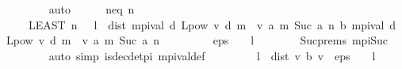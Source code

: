 \begin{isabellebody}
\ \ \ \ \ \ \isamarkupfalse%
\ auto\isanewline
\ \ \ \ \isamarkupfalse%
\ n{\isacharunderscore}{\kern0pt}eq{\isacharcolon}{\kern0pt}\ {\isachardoublequoteopen}n\ {\isacharequal}{\kern0pt}\isanewline
\ \ \ \ {\isacharparenleft}{\kern0pt}LEAST\ n{\isachardot}{\kern0pt}\ {}\ {\isacharasterisk}{\kern0pt}\ l\ {\isacharasterisk}{\kern0pt}\ dist\ {\isacharparenleft}{\kern0pt}mpi{\isacharunderscore}{\kern0pt}val\ {\isacharquery}{\kern0pt}d\ {\isacharparenleft}{\kern0pt}L{\isacharunderscore}{\kern0pt}pow\ v\ {\isacharquery}{\kern0pt}d\ {\isacharparenleft}{\kern0pt}m\ {}\ v{\isacharparenright}{\kern0pt}{\isacharparenright}{\kern0pt}\ {\isacharparenleft}{\kern0pt}{\isasymlambda}a{\isachardot}{\kern0pt}\ m\ {\isacharparenleft}{\kern0pt}Suc\ a{\isacharparenright}{\kern0pt}{\isacharparenright}{\kern0pt}\ n{\isacharparenright}{\kern0pt}\ {\isacharparenleft}{\kern0pt}{\isasymL}\isactrlsub b\ {\isacharparenleft}{\kern0pt}mpi{\isacharunderscore}{\kern0pt}val\ {\isacharquery}{\kern0pt}d\ {\isacharparenleft}{\kern0pt}L{\isacharunderscore}{\kern0pt}pow\ v\ {\isacharquery}{\kern0pt}d\ {\isacharparenleft}{\kern0pt}m\ {}\ v{\isacharparenright}{\kern0pt}{\isacharparenright}{\kern0pt}\ {\isacharparenleft}{\kern0pt}{\isasymlambda}a{\isachardot}{\kern0pt}\ m\ {\isacharparenleft}{\kern0pt}Suc\ a{\isacharparenright}{\kern0pt}{\isacharparenright}{\kern0pt}\ n{\isacharparenright}{\kern0pt}{\isacharparenright}{\kern0pt}\isanewline
\ \ \ \ \ \ \ \ {\isacharless}{\kern0pt}\ eps\ {\isacharasterisk}{\kern0pt}\ {\isacharparenleft}{\kern0pt}{}\ {\isacharminus}{\kern0pt}\ l{\isacharparenright}{\kern0pt}{\isacharparenright}{\kern0pt}{\isachardoublequoteclose}\isanewline
\ \ \ \ \ \ \isamarkupfalse%
\ Suc{\isachardot}{\kern0pt}prems\ mpi{\isacharunderscore}{\kern0pt}Suc{\isacharprime}{\kern0pt}\isanewline
\ \ \ \ \ \ \isamarkupfalse%
\ {\isacharparenleft}{\kern0pt}auto\ simp{\isacharcolon}{\kern0pt}\ is{\isacharunderscore}{\kern0pt}dec{\isacharunderscore}{\kern0pt}det{\isacharunderscore}{\kern0pt}pi\ mpi{\isacharunderscore}{\kern0pt}val{\isacharunderscore}{\kern0pt}def{\isacharparenright}{\kern0pt}\isanewline
\ \ \ \ \isamarkupfalse%
\ {\isachardoublequoteopen}{\isasymnot}\ {}\ {\isacharasterisk}{\kern0pt}\ l\ {\isacharasterisk}{\kern0pt}\ dist\ v\ {\isacharparenleft}{\kern0pt}{\isasymL}\isactrlsub b\ v{\isacharparenright}{\kern0pt}\ {\isacharless}{\kern0pt}\ eps\ {\isacharasterisk}{\kern0pt}\ {\isacharparenleft}{\kern0pt}{}\ {\isacharminus}{\kern0pt}\ l{\isacharparenright}{\kern0pt}{\isachardoublequoteclose}\isanewline

\end{isabellebody}
